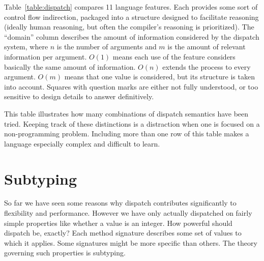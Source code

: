 
Table~\ref{table:dispatch} compares 11 language features.
Each provides some sort of control flow indirection, packaged into a
structure designed to facilitate reasoning (ideally human reasoning,
but often the compiler's reasoning is prioritized).
The ``domain'' column describes the amount of information considered
by the dispatch system, where $n$ is the number of arguments and
$m$ is the amount of relevant information per argument.
$O(1)$ means each use of the feature considers basically the same
amount of information.
$O(n)$ extends the process to every argument.
$O(m)$ means that one value is considered, but its structure is
taken into account.
Squares with question marks are either not fully understood, or too
sensitive to design details to answer definitively.


This table illustrates how many combinations of dispatch semantics have
been tried.
Keeping track of these distinctions is a distraction when one is focused
on a non-programming problem.
Including more than one row of this table makes a language especially
complex and difficult to learn.



\section{Subtyping}

So far we have seen some reasons why dispatch contributes significantly
to flexibility and performance.
However we have only actually dispatched on fairly simple properties like
whether a value is an integer.
How powerful should dispatch be, exactly?
Each method signature describes some set of values to which it applies.
Some signatures might be more specific than others.
The theory governing such properties is subtyping.


